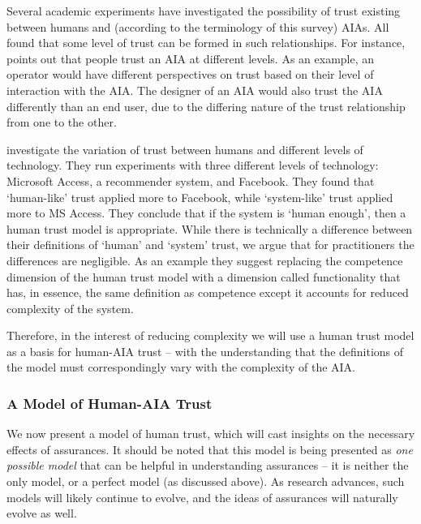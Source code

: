         Several academic experiments have investigated the possibility of trust existing between humans and (according to the terminology of this survey) AIAs. All found that some level of trust can be formed in such relationships. For instance, \citet{Lacher2014-yc} points out that people trust an AIA at different levels. As an example, an operator would have different perspectives on trust based on their level of interaction with the AIA. The designer of an AIA would also trust the AIA differently than an end user, due to the differing nature of the trust relationship from one to the other. 

        \citet{Tripp2011-rx} investigate the variation of trust between humans and different levels of technology. They run experiments with three different levels of technology: Microsoft Access, a recommender system, and Facebook. They found that `human-like' trust applied more to Facebook, while `system-like' trust applied more to MS Access. They conclude that if the system is `human enough', then a human trust model is appropriate. While there is technically a difference between their definitions of `human' and `system' trust, we argue that for practitioners the differences are negligible. As an example they suggest replacing the competence dimension of the human trust model with a dimension called functionality that has, in essence, the same definition as competence except it accounts for reduced complexity of the system.

        Therefore, in the interest of reducing complexity we will use a human trust model as a basis for human-AIA trust -- with the understanding that the definitions of the model must correspondingly vary with the complexity of the AIA.

\subsubsection{A Model of Human-AIA Trust}
        We now present a model of human trust, which will cast insights on the necessary effects of assurances. It should be noted that this model is being presented as \emph{one possible model} that can be helpful in understanding assurances -- it is neither the only model, or a perfect model (as discussed above). As research advances, such models will likely continue to evolve, and the ideas of assurances will naturally evolve as well.

